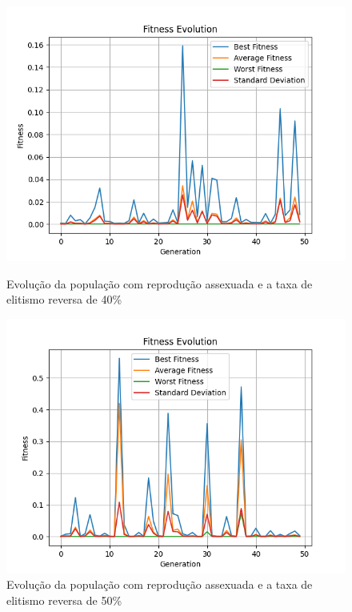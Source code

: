 \documentclass[12pt]{article}
\begin{document}
\begin{figure}[h]
    \centering
    \begin{minipage}{0.5\textwidth}
        \centering
        \includegraphics[width=\linewidth]{figures/assexuado/rev_el_40.png}
        \caption{Evolução da população com reprodução assexuada e a taxa de elitismo reversa de 40\%}
        \label{fig:reverse_elitism_assex_40}
    \end{minipage}\hfill
    \begin{minipage}{0.5\textwidth}
        \centering
        \includegraphics[width=\linewidth]{figures/assexuado/rev_el_50.png}
        \caption{Evolução da população com reprodução assexuada e a taxa de elitismo reversa de 50\%}
        \label{fig:reverse_elitism_assex_50}
    \end{minipage}
\end{figure}
\end{document}
